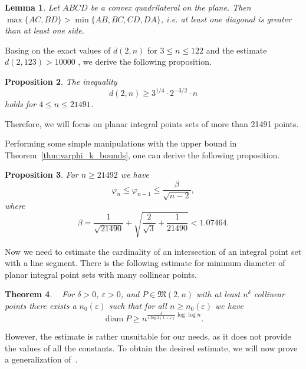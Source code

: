 \documentclass[a4paper,14pt]{article} %
\theoremstyle{plain}
\newtheorem{theorem}{Theorem}[section]
\newtheorem{lemma}[theorem]{Lemma}
\newtheorem{proposition}[theorem]{Proposition}
\theoremstyle{definition}
\begin{document}
\begin{lemma}
	\label{lemma:quadr_diag_edges}
	Let $ABCD$ be a convex quadrilateral on the plane.
	Then $\max\{AC,BD\}>\min\{AB,BC,CD,DA\}$,
	i.e. at least one diagonal is greater than at least one side.
\end{lemma}


Basing on the exact values of $d(2,n)$ for $ 3 \leq n\leq 122$ and the estimate $d(2,123)>10000$
\cite{kurz2008bounds}, we derive the following proposition.
\begin{proposition}
	\label{obs:4_leq_n_leq_21491}
	The inequality
	\begin{equation}
		d(2,n) \geq 3^{1/4}\cdot2^{-3/2} \cdot n
	\end{equation}
	holds for $4 \leq n \leq 21491$.
\end{proposition}

Therefore, we will focus on planar integral points sets of more than 21491 points.

Performing some simple manipulations with the upper bound in Theorem~\ref{thm:varphi_k_bounds},
one can derive the following proposition.
\begin{proposition}
	\label{varphi_n_where_n_geq_21492}
	For $n \geq 21492$ we have
	\begin{equation}
		\varphi_n \leq \varphi_{n-1} \leq \frac{\beta}{\sqrt{n-2}}
		,
	\end{equation}
	where
	\begin{equation}
		\beta = \frac{1}{\sqrt{21490}} + \sqrt{ \frac{2}{\sqrt{3}} + \frac{1}{21490} } < 1.07464
		.
	\end{equation}
\end{proposition}

Now we need to estimate the cardinality of an intersection of an integral point set with a line segment.
There is the following estimate for minimum diameter of planar integral point sets with many collinear points.
\begin{theorem}~\cite[Theorem 4]{kurz2008minimum}
	For $\delta > 0$, $\varepsilon > 0$, and $P\in\mathfrak{M}(2,n)$ with
	at least $n^\delta$ collinear points there exists a $n_0 (\varepsilon)$
	such that for all $n \geq n_0 (\varepsilon)$ we have
	\begin{equation}
		\operatorname{diam} P \geq n^{\frac{\delta}{4 \log 2(1+\varepsilon)}\log \log n}
		.
	\end{equation}
\end{theorem}
However, the estimate is rather unsuitable for our needs,
as it does not provide the values of all the constants.
To obtain the desired estimate, we will now prove a generalization of~\cite[lemma 3]{our-vmmsh-2018}.
\end{document}

